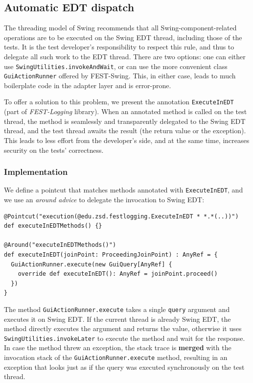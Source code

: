 \subsection{Automatic EDT dispatch}\label{sec:edt-dispatch}

The threading model of Swing recommends that all Swing-component-related operations are to be executed on the Swing EDT thread, including those of the tests. It is the test developer's responsibility to respect this rule, and thus to delegate all such work to the EDT thread. There are two options: one can either use \texttt{Swing\-Utilities.invoke\-And\-Wait}, or can use the more convenient class \texttt{GuiActionRunner} offered by FEST-Swing. This, in either case, leads to much boilerplate code in the adapter layer and is error-prone.

To offer a solution to this problem, we present the annotation \texttt{ExecuteInEDT} (part of \emph{FEST-Logging} library). When an annotated method is called on the test thread, the method is seamlessly and transparently delegated to the Swing EDT thread, and the test thread awaits the result (the return value or the exception). This leads to less effort from the developer's side, and at the same time, increases security on the tests' correctness.

\subsubsection{Implementation}\label{sec:edt-dispatch}

We define a pointcut that matches methods annotated with \texttt{ExecuteInEDT}, and we use an \emph{around advice} to delegate the invocation to Swing EDT:
\begin{lstlisting}
@Pointcut("execution(@edu.zsd.festlogging.ExecuteInEDT * *.*(..))")
def executeInEDTMethods() {}

@Around("executeInEDTMethods()")
def executeInEDT(joinPoint: ProceedingJoinPoint) : AnyRef = {
  GuiActionRunner.execute(new GuiQuery[AnyRef] {
    override def executeInEDT(): AnyRef = joinPoint.proceed()
  })
}
\end{lstlisting}

The method \texttt{GuiActionRunner.execute} takes a single \texttt{query} argument and executes it on Swing EDT. If the current thread is already Swing EDT, the method directly executes the argument and returns the value, otherwise it uses \texttt{SwingUtilities.invokeLater} to execute the method and wait for the response. In case the method threw an exception, the stack trace is \textbf{merged} with the invocation stack of the \texttt{GuiActionRunner.execute} method, resulting in an exception that looks just as if the query was executed synchronously on the test thread.

